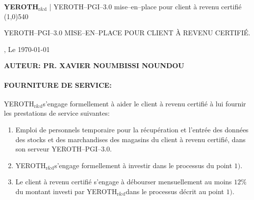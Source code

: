 \documentclass[10pt, a4paper]{article}
\newcommand{\yerothrd}{\textcolor{yerothColorGreen}
			{\textsc{\textcolor{yerothColorRed}{YEROTH}}$_{\text{r\&d}}$\xspace}}
\newcommand{\yerothpgitroiszero}{\textsc{YEROTH--PGI--$3.0$}\xspace}
\newcommand{\myfullacademicname}{PR. XAVIER NOUMBISSI NOUNDOU\xspace}
\newcommand{\yerothmiseenplace}{mise--en--place\xspace}
\begin{document}
{\bf \Large \yerothrd} {| \sc \scriptsize \yerothpgitroiszero \yerothmiseenplace pour client à
 revenu certifié}
\\ \line(1,0){540}

\vspace{3.5em}


\parbox{27em}{\LARGE \yerothpgitroiszero MISE--EN--PLACE POUR CLIENT À REVENU CERTIFIÉ.}

{\hfill \datedayname, Le \today}

\vspace{2.0em}

\begin{center}
\textbf{AUTEUR: \myfullacademicname}
\end{center}

\vspace{2.5em}


\paragraph{FOURNITURE DE SERVICE:\\}
\parbox{36.999em}{
\vspace{1em}
\yerothrd s'engage formellement à aider le client
à revenu certifié à lui fournir les prestations
de service suivantes:\\

\begin{enumerate}[1.]
	\item Emploi de personnels temporaire pour la
		récupération et l'entrée des données
		des stocks et des marchandises des magasins
		du client à revenu certifié, dans son
		serveur \textcolor{yerothColorGreen}{\yerothpgitroiszero}.
		
	\item \yerothrd s'engage formellement à investir
		dans le processus du point $1)$.
		
	\item Le client à revenu certifié s'engage à
		débourser mensuellement au moins $12\%$ du montant
		investi par \yerothrd dans le processus décrit
		au point $1)$.
\end{enumerate}
}

	
\end{document}
